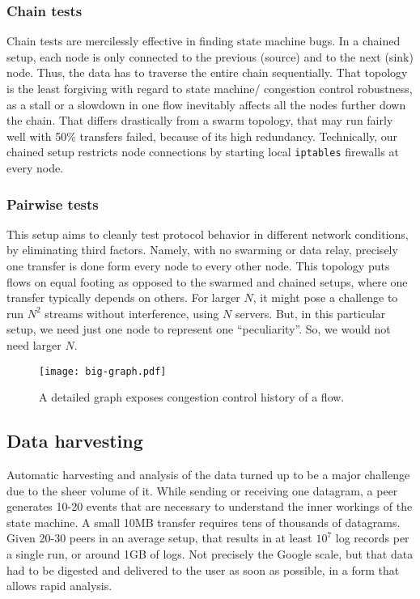 \documentclass[conference]{IEEEtran}
\begin{document}
\subsubsection{Chain tests}

Chain tests are mercilessly effective in finding state machine bugs.
In a chained setup, each node is only connected to the previous (source) and to the next (sink) node. Thus, the data has to traverse the entire chain sequentially.
That topology is the least forgiving with regard to state machine/ congestion control robustness, as a stall or a slowdown in one flow inevitably affects all the nodes further down the chain. That differs drastically from a swarm topology, that may run fairly well with 50\% transfers failed, because of its high redundancy.
Technically,  our chained setup restricts node connections by starting local {\tt iptables} firewalls at every node.

\subsubsection{Pairwise tests}
This setup aims to cleanly test protocol behavior in different network conditions, by eliminating third factors. Namely, with no swarming or data relay, precisely one transfer is done form every node to every other node.
This topology puts flows on equal footing as opposed to the swarmed and chained setups, where one transfer typically depends on others.
For larger $N$, it might pose a challenge to run $N^{2}$ streams without interference, using $N$ servers. But, in this particular setup, we need just one node to represent one ``peculiarity''. So, we would not need larger $N$.

\begin{figure*}[hb]
\centering
\texttt{[image: big-graph.pdf]}
\caption{A detailed graph exposes congestion control history of a flow.}
\label{fig:graph}
\end{figure*}

\subsection{Data harvesting}

Automatic harvesting and analysis of the data turned up to be a major challenge due to the sheer volume of it. While sending or receiving one datagram, a peer generates 10-20 events that are necessary to understand the inner workings of the state machine. A small 10MB transfer requires tens of thousands of datagrams. Given 20-30 peers in an average setup, that results in at least $10^{7}$ log records per a single run, or around 1GB of logs. Not precisely the Google scale, but that data had to be digested and delivered to the user as soon as possible, in a form that allows rapid analysis.
\end{document}
